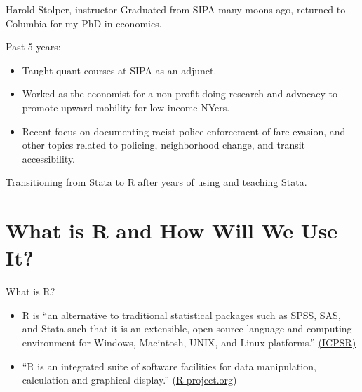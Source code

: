 \documentclass[
  8pt,
  ignorenonframetext,
  dvipsnames]{beamer}
\providecommand{\tightlist}{%
  \setlength{\itemsep}{0pt}\setlength{\parskip}{0pt}}
\let\olditem\item
\renewcommand{\item}{%
  \olditem\vspace{4pt}
}
\begin{document}
\begin{frame}{Harold Stolper, instructor}
\protect\hypertarget{harold-stolper-instructor}{}
Graduated from SIPA many moons ago, returned to Columbia for my PhD in
economics.

\medskip

Past 5 years:

\begin{itemize}
\tightlist
\item
  Taught quant courses at SIPA as an adjunct.
\item
  Worked as the economist for a non-profit doing research and advocacy
  to promote upward mobility for low-income NYers.
\item
  Recent focus on documenting racist police enforcement of fare evasion,
  and other topics related to policing, neighborhood change, and transit
  accessibility.
\end{itemize}

\medskip

Transitioning from Stata to R after years of using and teaching Stata.
\end{frame}

\hypertarget{what-is-r-and-how-will-we-use-it}{%
\section{What is R and How Will We Use
It?}\label{what-is-r-and-how-will-we-use-it}}

\begin{frame}{What is R?}
\protect\hypertarget{what-is-r}{}
\begin{itemize}
\tightlist
\item
  R is ``an alternative to traditional statistical packages such as
  SPSS, SAS, and Stata such that it is an extensible, open-source
  language and computing environment for Windows, Macintosh, UNIX, and
  Linux platforms.''
  \href{https://www.icpsr.umich.edu/icpsrweb/content/shared/ICPSR/faqs/what-is-r.html}{(ICPSR)}
\end{itemize}

\medskip

\begin{itemize}
\tightlist
\item
  ``R is an integrated suite of software facilities for data
  manipulation, calculation and graphical display.''
  (\href{https://www.r-project.org/about.html}{R-project.org})
\end{itemize}
\end{frame}
\end{document}
